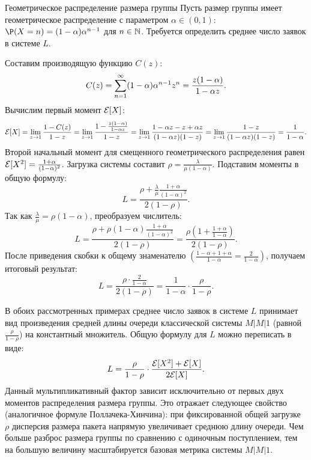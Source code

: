 \begin{example}{Геометрическое распределение размера группы}
Пусть размер группы имеет геометрическое распределение с параметром $\alpha \in (0, 1)$: $\P(X = n) = (1 - \alpha) \alpha^{n-1}$ для $n \in \mathbb{N}$. Требуется определить среднее число заявок в системе $L$.
\end{example}

\begin{eproof}
Составим производящую функцию $C(z)$:
$$ C(z) = \displaystyle \sum_{n=1}^{\infty} (1 - \alpha) \alpha^{n-1} z^n = \frac{z(1 - \alpha)}{1 - \alpha z}. $$
Вычислим первый момент $\mathcal{E}[X]$:
$$ \mathcal{E}[X] = \lim_{z \to 1} \frac{1 - C(z)}{1 - z} = \lim_{z \to 1} \frac{1 - \frac{z(1-\alpha)}{1-\alpha z}}{1 - z} = \lim_{z \to 1} \frac{1 - \alpha z - z + \alpha z}{(1 - \alpha z)(1 - z)} = \lim_{z \to 1} \frac{1 - z}{(1 - \alpha z)(1 - z)} = \frac{1}{1 - \alpha}. $$
Второй начальный момент для смещенного геометрического распределения равен $\mathcal{E}[X^2] = \frac{1 + \alpha}{(1 - \alpha)^2}$. Загрузка системы составит $\rho = \frac{\lambda}{\mu (1 - \alpha)}$.
Подставим моменты в общую формулу:
$$ L = \frac{\rho + \frac{\lambda}{\mu} \frac{1 + \alpha}{(1 - \alpha)^2}}{2(1 - \rho)}. $$
Так как $\frac{\lambda}{\mu} = \rho (1 - \alpha)$, преобразуем числитель:
$$ L = \frac{\rho + \rho (1 - \alpha) \frac{1 + \alpha}{(1 - \alpha)^2}}{2(1 - \rho)} = \frac{\rho \left(1 + \frac{1 + \alpha}{1 - \alpha}\right)}{2(1 - \rho)}. $$
После приведения скобки к общему знаменателю $\left( \frac{1 - \alpha + 1 + \alpha}{1 - \alpha} = \frac{2}{1 - \alpha} \right)$, получаем итоговый результат:
$$ L = \frac{\rho \cdot \frac{2}{1 - \alpha}}{2(1 - \rho)} = \frac{1}{1 - \alpha} \cdot \frac{\rho}{1 - \rho}. $$
\end{eproof}

\begin{note}
В обоих рассмотренных примерах среднее число заявок в системе $L$ принимает вид произведения средней длины очереди классической системы $M|M|1$ (равной $\frac{\rho}{1-\rho}$) на константный множитель. Общую формулу для $L$ можно переписать в виде:
$$ L = \frac{\rho}{1 - \rho} \cdot \frac{\mathcal{E}[X^2] + \mathcal{E}[X]}{2 \mathcal{E}[X]}. $$
Данный мультипликативный фактор зависит исключительно от первых двух моментов распределения размера группы. Это отражает следующее свойство (аналогичное формуле Поллачека-Хинчина): при фиксированной общей загрузке $\rho$ дисперсия размера пакета напрямую увеличивает среднюю длину очереди. Чем больше разброс размера группы по сравнению с одиночным поступлением, тем на большую величину масштабируется базовая метрика системы $M|M|1$.
\end{note}